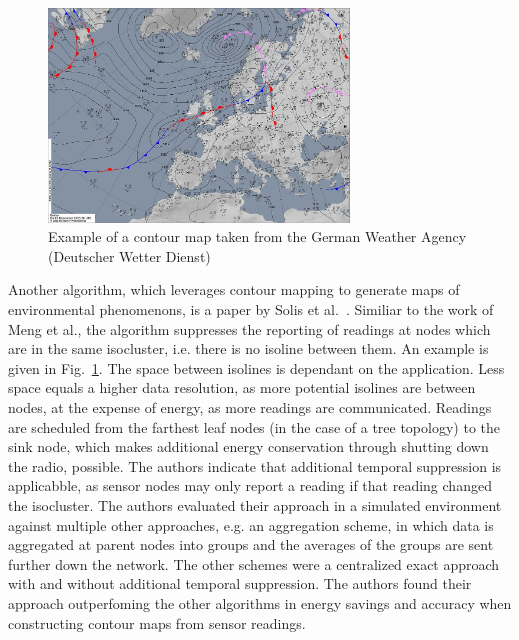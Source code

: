 \begin{figure}[h]
\includegraphics[width=8cm]{images/contour-map.jpg}
\caption{Example of a contour map taken from the German Weather Agency (Deutscher Wetter Dienst)~\cite{dwd}}
\label{fig:contour map}
\centering
\end{figure}

Another algorithm, which leverages contour mapping to generate maps of
environmental phenomenons, is a paper by Solis et
al.~\cite{solis2005efficient}. Similiar to the work of Meng et al., the
algorithm suppresses the reporting of readings at nodes which are in the same
isocluster, i.e. there is no isoline between them. An example is given in
Fig.~\ref{fig:contour map}. The space between isolines is dependant on the
application. Less space equals a higher data resolution, as more potential
isolines are between nodes, at the expense of energy, as more readings are
communicated. Readings are scheduled from the farthest leaf nodes (in the case
of a tree topology) to the sink node, which makes additional energy
conservation through shutting down the radio, possible. The authors indicate
that additional temporal suppression is applicabble, as sensor nodes may only
report a reading if that reading changed the isocluster. The authors evaluated
their approach in a simulated environment against multiple other approaches,
e.g. an aggregation scheme, in which data is aggregated at parent nodes into
groups and the averages of the groups are sent further down the network. The
other schemes were a centralized exact approach with and without additional
temporal suppression. The authors found their approach outperfoming the other
algorithms in energy savings and accuracy when constructing contour maps from
sensor readings.

